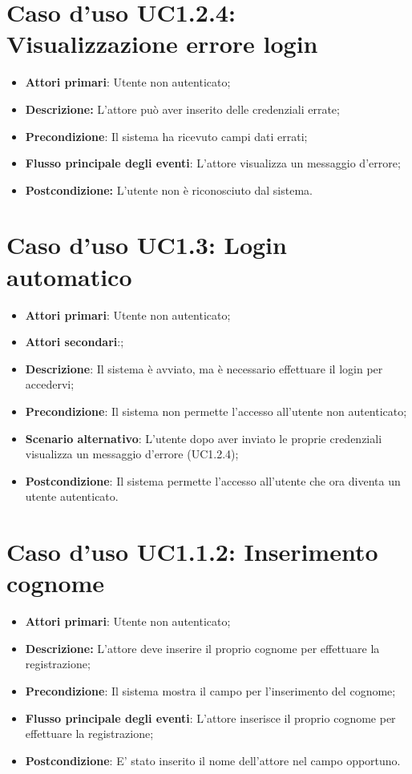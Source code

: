 	\section{Caso d'uso UC1.2.4: Visualizzazione errore login}
		\begin{itemize}
			\item \textbf{Attori primari}: Utente non autenticato;
			\item \textbf{Descrizione:} L'attore può aver inserito delle credenziali errate;
			\item \textbf{Precondizione}: Il sistema ha ricevuto campi dati errati;
			\item \textbf{Flusso principale degli eventi}: L'attore visualizza un messaggio d'errore;
			\item \textbf{Postcondizione:} L'utente non è riconosciuto dal sistema.
		\end{itemize}
	\section{Caso d'uso UC1.3: Login automatico}
	\begin{itemize}
		\item \textbf{Attori primari}: Utente non autenticato;
		\item \textbf{Attori secondari}:;
		\item \textbf{Descrizione}: Il sistema è avviato, ma è necessario effettuare il login per accedervi;
		\item \textbf{Precondizione}: Il sistema non permette l'accesso all'utente non autenticato;
		\item \textbf{Scenario alternativo}: L'utente dopo aver inviato le proprie credenziali visualizza un messaggio d'errore (UC1.2.4);
		\item \textbf{Postcondizione}: Il sistema permette l'accesso all'utente che ora diventa un utente autenticato.
		\end{itemize}
		\section{Caso d'uso UC1.1.2: Inserimento cognome}
		\begin{itemize}
			\item \textbf{Attori primari}: Utente non autenticato;
			\item \textbf{Descrizione:} L'attore deve inserire il proprio cognome per effettuare la registrazione;
			\item \textbf{Precondizione}: Il sistema mostra il campo per l'inserimento del cognome;
			\item \textbf{Flusso principale degli eventi}: L'attore inserisce il proprio cognome per effettuare la registrazione;
			\item \textbf{Postcondizione}: E' stato inserito il nome dell'attore nel campo opportuno.
		\end{itemize}
